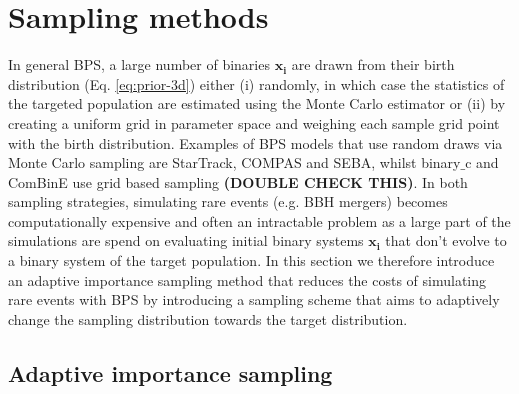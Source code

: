 \documentclass[a4paper,fleqn,usenatbib]{mnras}
\begin{document}
\section{Sampling methods}
\label{sec:sampling-methods}
In general BPS, a large number of binaries $\mathbf{x_i}$ are drawn from their birth distribution (Eq. \ref{eq:prior-3d}) either (i) randomly,  in which case the statistics of the targeted population are estimated using the Monte Carlo estimator  or (ii) by creating a uniform grid in parameter space and weighing each sample grid point with the birth distribution. 
Examples of BPS models that use random draws via Monte Carlo sampling are StarTrack, COMPAS and SEBA, whilst binary$\_$c and ComBinE use grid based sampling \textbf{(DOUBLE CHECK THIS)}.
In both sampling strategies, simulating rare events (e.g. BBH mergers) becomes computationally expensive and often an intractable problem as a large part of the simulations are spend on evaluating initial binary systems $\mathbf{x_i}$ that don't evolve to a binary system of the target population. In this section we therefore introduce an adaptive importance sampling method that reduces the costs of simulating rare events with BPS by introducing a sampling scheme that aims to adaptively change the sampling distribution towards the target distribution. 



 


%
%
%
%

\subsection{Adaptive importance sampling}
\label{subsec:AISsampling}
%
\end{document}
